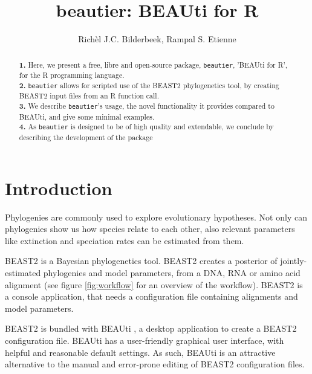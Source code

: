 \documentclass{article}
\title{beautier: BEAUti for R}
\author{Rich\`el J.C. Bilderbeek, Rampal S. Etienne}
\begin{document}
\maketitle


\begin{abstract}
  \textbf{1. }
    Here, we present a free, libre and open-source package, \verb;beautier;, 
    'BEAUti for R', for the R programming language. \\
  \textbf{2. }
    \verb;beautier; allows for scripted use of the BEAST2 phylogenetics tool, 
    by creating BEAST2 input files from an R function call. \\
  \textbf{3. }
    We describe \verb;beautier;'s usage, the novel functionality it provides
    compared to BEAUti, and give some minimal examples. \\
  \textbf{4. }
    As \verb;beautier; is designed to be of high quality and extendable, 
    we conclude by describing the development of the package \\
\end{abstract}


\section{Introduction}

Phylogenies are commonly used to explore evolutionary hypotheses.
Not only can phylogenies show us how species relate to each other, 
also relevant parameters like extinction and speciation rates can be estimated from them.

BEAST2 \cite{bouckaert2014beast} is a Bayesian phylogenetics tool.
BEAST2 creates a posterior of jointly-estimated phylogenies and model parameters, 
from a DNA, RNA or amino acid alignment (see figure \ref{fig:workflow} for an overview of the workflow). 
BEAST2 is a console application, that needs a configuration file containing alignments and model parameters.

BEAST2 is bundled with BEAUti \cite{drummond2012bayesian}, a desktop application to create a BEAST2 configuration file.
BEAUti has a user-friendly graphical user interface, with helpful and reasonable default settings.
As such, BEAUti is an attractive alternative to the manual and error-prone editing of BEAST2 configuration files. 
\end{document}
